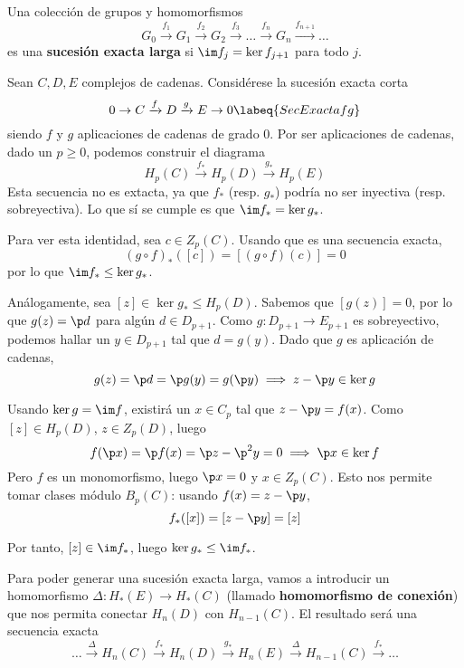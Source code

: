 \begin{defn}
Una colección de grupos y homomorfismos
\[G_0 \xrightarrow{ f_1 } G_1 \xrightarrow{ f_2 } G_2
\xrightarrow{ f_3 } \dots \xrightarrow{ f_n } G_n \xrightarrow{f_{n+1}} \dots\]
es una \textbf{sucesión exacta larga} si $\im f_j=\ker f_{j+1}$ para todo $j$.
\end{defn}

\begin{remark}
Sean $C,D,E$ complejos de cadenas. Considérese la sucesión exacta corta
\begin{equation}
0 \to C \xrightarrow{ f } D \xrightarrow{ g } E \to 0 \labeq{SecExactafg}
\end{equation}
siendo $f$ y $g$ aplicaciones de cadenas de grado 0. Por ser aplicaciones de
cadenas, dado un $p \geq 0$, podemos construir el diagrama
\[H_p(C) \xrightarrow{ f_* } H_p(D) \xrightarrow{ g_* } H_p(E)\]
Esta secuencia no es extacta, ya que $f_*$ (resp. $g_*$) podría no ser inyectiva
(resp. sobreyectiva). Lo que sí se cumple es que $\im f_*=\ker g_*$.

Para ver esta identidad, sea $c \in Z_p(C)$. Usando que  es
una secuencia exacta,
\[(g\circ f)_*([c])=[(g\circ f)(c)]=0\]
por lo que $\im f_* \leq \ker g_*$.

Análogamente, sea $[z] \in \ker g_* \leq H_p(D)$. Sabemos que $[g(z)]=0$, por
lo que $g(z)=\p d$ para algún $d \in D_{p+1}$. Como $g\colon D_{p+1} \to
E_{p+1}$ es sobreyectivo, podemos hallar un $y \in D_{p+1}$ tal que $d=g(y)$.
Dado que $g$ es aplicación de cadenas,
\[g(z)=\p d=\p g(y)=g(\p y) \implies z-\p y \in \ker g\]

Usando $\ker g=\im f$, existirá un $x \in C_p$ tal que $z-\p y=f(x)$. Como
$[z] \in H_p(D)$, $z \in Z_p(D)$, luego
\[f(\p x)=\p f(x)=\p z-\p^2 y=0 \implies \p x \in \ker f\]
Pero $f$ es un monomorfismo, luego $\p x =0$ y $x \in Z_p(C)$. Esto nos permite
tomar clases módulo $B_p(C)$: usando $f(x)=z-\p y$,
\[f_*([x])=[z-\p y]=[z]\]

Por tanto, $[z] \in \im f_*$, luego $\ker g_* \leq \im f_*$.
\end{remark}

Para poder generar una sucesión exacta larga, vamos a introducir un homomorfismo
$\Delta\colon H_*(E) \to H_*(C)$ (llamado \textbf{homomorfismo de conexión}) que
nos permita conectar $H_n(D)$ con $H_{n-1}(C)$. El resultado será una secuencia
exacta
\[\dots \xrightarrow{\Delta} H_n(C) \xrightarrow{ f_* } H_n(D) \xrightarrow{ g_* } H_n(E)
\xrightarrow{ \Delta } H_{n-1}(C)\xrightarrow{f_*}\dots\]

